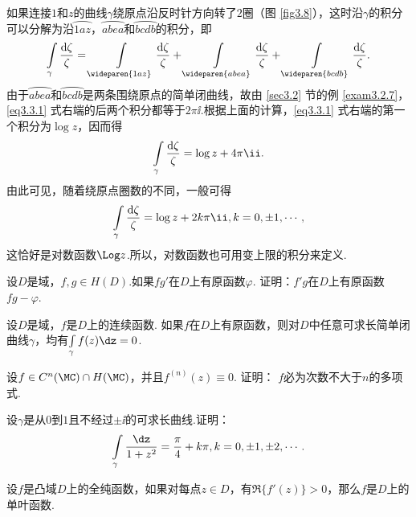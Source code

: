 \noindent 如果连接$1$和$z$的曲线$\gamma$绕原点沿反时针方向转了$2$圈（图 \ref{fig3.8}），这时沿$\gamma$的积分可以分解为沿$\wideparen{1az}$，$\wideparen{abea}$和$\wideparen{bcdb}$的积分，即
\begin{equation}\label{eq3.3.1}
\int\limits_\gamma\frac{\textrm d\zeta}{\zeta}
=\int\limits_{\wideparen{1az}}\frac{\textrm d\zeta}{\zeta}+\int\limits_{\wideparen{abea}}\frac{\textrm d\zeta}{\zeta}+\int\limits_{\wideparen{bcdb}}\frac{\textrm d\zeta}{\zeta}.
\end{equation}
由于$\wideparen{abea}$和$\wideparen{bcdb}$是两条围绕原点的简单闭曲线，故由 \ref{sec3.2} 节的例 \ref{exam3.2.7}，\eqref{eq3.3.1} 式右端的后两个积分都等于$2\pi\ii$.根据上面的计算，\eqref{eq3.3.1} 式右端的第一个积分为$\log z$，因而得
\[\int\limits_\gamma\frac{\textrm d\zeta}\zeta=\log z+4\pi\ii.\]
由此可见，随着绕原点圈数的不同，一般可得
\[\int\limits_\gamma\frac{\textrm d\zeta}\zeta=\log z+2k\pi\ii,k=0,\pm1,\cdots,\]
这恰好是对数函数$\Log z$.所以，对数函数也可用变上限的积分来定义.
\begin{xiti}
\item 设$D$是域，$f,g\in H(D)$.如果$fg'$在$D$上有原函数$\varphi$. 证明：$f'g$在$D$上有原函数$fg-\varphi$.
\item 设$D$是域，$f$是$D$上的连续函数. 如果$f$在$D$上有原函数，则对$D$中任意可求长简单闭曲线$\gamma$，均有$\int\limits_\gamma f(z)\dz=0$.
\item 设$f\in C^n(\MC)\cap H(\MC)$，并且$f^{(n)}(z)\equiv0$. 证明： $f$必为次数不大于$n$的多项式.
\item 设$\gamma$是从$0$到$1$且不经过$\pm\ii$的可求长曲线.证明：
\[\int\limits_\gamma\frac{\dz}{1+z^2}=\frac\pi4+k\pi,k=0,\pm1,\pm2,\cdots.\]
\item 设$f$是凸域$D$上的全纯函数，如果对每点$z\in D$，有$\Re \{f'(z)\}>0$，那么$f$是$D$上的单叶函数.
\end{xiti}

